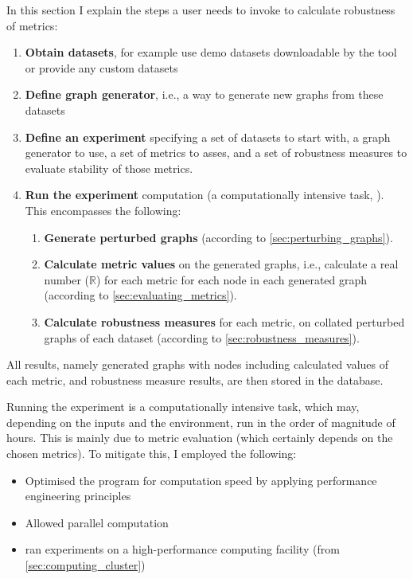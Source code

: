 In this section I explain the steps a user needs to invoke to calculate robustness of metrics:
\begin{enumerate}[topsep=5pt,itemsep=0pt]
    \item \textbf{Obtain datasets}, for example use demo datasets downloadable by the \graffs tool or provide any custom datasets
    \item \textbf{Define graph generator}, i.e., a way to generate new graphs from these datasets
    \item \textbf{Define an experiment} specifying a set of datasets to start with, a graph generator to use, a set of metrics to asses, and a set of robustness measures to evaluate stability of those metrics.
    \item \textbf{Run the experiment} computation (a computationally intensive task, ).
    This encompasses the following:
    \begin{enumerate}[label=\alph*.]
        \item \textbf{Generate perturbed graphs} (according to \autoref{sec:perturbing_graphs}).
        \item \textbf{Calculate metric values} on the generated graphs, i.e., calculate a real number ($\mathbb{R}$) for each metric for each node in each generated graph (according to \autoref{sec:evaluating_metrics}).
        \item \textbf{Calculate robustness measures} for each metric, on collated perturbed graphs of each dataset (according to \autoref{sec:robustness_measures}).
    \end{enumerate}
\end{enumerate}

All results, namely generated graphs with nodes including calculated values of each metric, and robustness measure results, are then stored in the database.



Running the experiment is a computationally intensive task, which may, depending on the inputs and the environment, run in the order of magnitude of hours.
This is mainly due to metric evaluation (which certainly depends on the chosen metrics).
To mitigate this, I employed the following:
\begin{itemize}[topsep=5pt,itemsep=-2pt]
    \item Optimised the program for computation speed by applying performance engineering principles
    \item Allowed parallel computation
    \item ran experiments on a high-performance computing facility (from \autoref{sec:computing_cluster})
\end{itemize}

